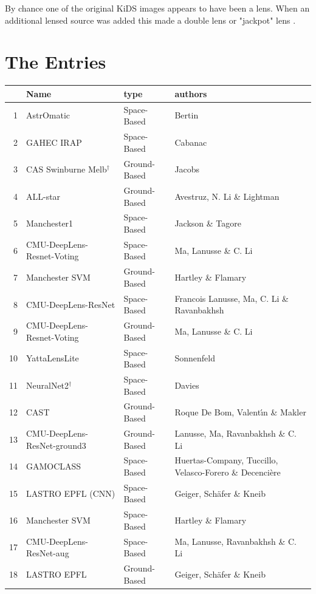 \documentclass{aa}
\begin{document}
By chance one of the original KiDS images appears to have been a lens.  When an additional lensed source was added this made a double lens or "jackpot" lens \citep{2008ApJ...677.1046G}.

\section{The Entries}
\label{sec:entries}


\begin{table}
\centering
\begin{tabular}{rlll}
  \hline
 & Name & type & authors \\ 
  \hline
  1 & AstrOmatic & Space-Based & Bertin   \\ 
  2 & GAHEC IRAP & Space-Based & Cabanac  \\ 
  3 & CAS Swinburne Melb$^\dagger$& Ground-Based & Jacobs   \\ 
  4 & ALL-star & Ground-Based & Avestruz, N. Li \& Lightman  \\ 
  5 & Manchester1 & Space-Based & Jackson \& Tagore  \\ 
  6 & CMU-DeepLens-Resnet-Voting & Space-Based & Ma, Lanusse \& C. Li  \\ 
  7 & Manchester SVM & Ground-Based & Hartley \& Flamary  \\ 
  8 & CMU-DeepLens-ResNet & Space-Based & Francois Lanusse, Ma, C. Li \& Ravanbakhsh \\ 
  9 & CMU-DeepLens-Resnet-Voting & Ground-Based & Ma, Lanusse \& C. Li   \\ 
  10 & YattaLensLite & Space-Based &  Sonnenfeld  \\ 
  11 & NeuralNet2$^\dagger$ & Space-Based &  Davies  \\ 
  12 & CAST & Ground-Based &  Roque De Bom, Valent\'{\i}n \&  Makler  \\ 
  13 & CMU-DeepLens-ResNet-ground3 & Ground-Based &  Lanusse, Ma, Ravanbakhsh \& C. Li \\ 
  14 & GAMOCLASS & Space-Based &  Huertas-Company, Tuccillo, Velasco-Forero \& Decenci\`{e}re \\ 
  15 & LASTRO EPFL (CNN) & Space-Based & Geiger, Sch\"{a}fer \& Kneib \\ 
  16 & Manchester SVM & Space-Based &  Hartley  \& Flamary\\ 
  17 & CMU-DeepLens-ResNet-aug & Space-Based & Ma,  Lanusse, Ravanbakhsh \& C. Li \\ 
  18 & LASTRO EPFL & Ground-Based & Geiger, Sch\"{a}fer \& Kneib   \\ 

\end{tabular}
\end{table}
\end{document}
